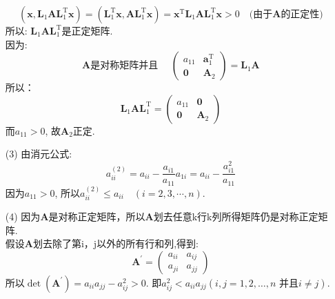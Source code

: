 \documentclass[a4paper]{article}
\begin{document}
\begin{enumerate}
\begin{equation}
        \left(\boldsymbol{x}, \boldsymbol{L}_{1} \boldsymbol{A} \boldsymbol{L}_{1}^{\mathrm{T}} \boldsymbol{x}\right)=\left(\boldsymbol{L}_{1}^{\mathrm{T}} \boldsymbol{x}, \boldsymbol{A L}_{1}^{\mathrm{T}} \boldsymbol{x}\right) = \boldsymbol{x}^{\mathrm{T}}\boldsymbol{L}_{1}\boldsymbol{A} \boldsymbol{L}_{1}^{\mathrm{T}} \boldsymbol{x}>0 \quad \text{(由于$\boldsymbol{A}$的正定性)}\nonumber
    \end{equation}
    所以: $\boldsymbol{L}_{1}\boldsymbol{A} \boldsymbol{L}_{1}^{\mathrm{T}}$是正定矩阵. \\
    因为:
    \begin{equation}
        \text{$\boldsymbol{A}$是对称矩阵并且 }\quad
        \left(\begin{array}{cc}a_{11} & \boldsymbol{a}_{1}^{\mathrm{T}} \\ \mathbf{0} & \boldsymbol{A}_{2}\end{array}\right)=\boldsymbol{L}_{1} \boldsymbol{A}  \nonumber
    \end{equation}
    所以：
    \begin{equation}
        \boldsymbol{L}_{1} \boldsymbol{A} \boldsymbol{L}_{1}^{\mathrm{T}}=\left(\begin{array}{cc}a_{11} & \mathbf{0} \\ \mathbf{0} & \boldsymbol{A}_{2}\end{array}\right) \nonumber
    \end{equation}
    而$a_{11} > 0$, 故$\boldsymbol{A}_2$正定.
    \item [(3)]
    由消元公式:
    $$a_{ii}^{(2)}=a_{ii}-\frac{a_{i1}}{a_{11}}a_{1i} = a_{ii} - \frac{a_{i1}^2}{a_{11}}$$
    因为$a_{11} > 0$, 所以$a_{i i}^{(2)} \leqslant a_{i i} \quad(i=2,3, \cdots, n)$.
    \item [(4)]
    因为$\boldsymbol{A}$是对称正定矩阵，所以$\boldsymbol{A}$划去任意k行k列所得矩阵仍是对称正定矩阵. \\
    假设$\boldsymbol{A}$划去除了第i，j以外的所有行和列,得到:
    \begin{equation}
        \boldsymbol{A}^{\prime}=\left(\begin{array}{cc}a_{ii} & a_{ij} \\ a_{ji} & a _{jj}\end{array}\right) \nonumber
    \end{equation}
    所以$\operatorname*{det}(\boldsymbol{A}^{\prime})=a_{ii}a_{jj} - a_{ij}^{2} > 0$.
    即$a_{ij}^{2} < a_{ii}a_{jj}(i, j = 1, 2, \ldots, n \text{ 并且} i \neq j)$. \\

\end{enumerate}
\end{document}

